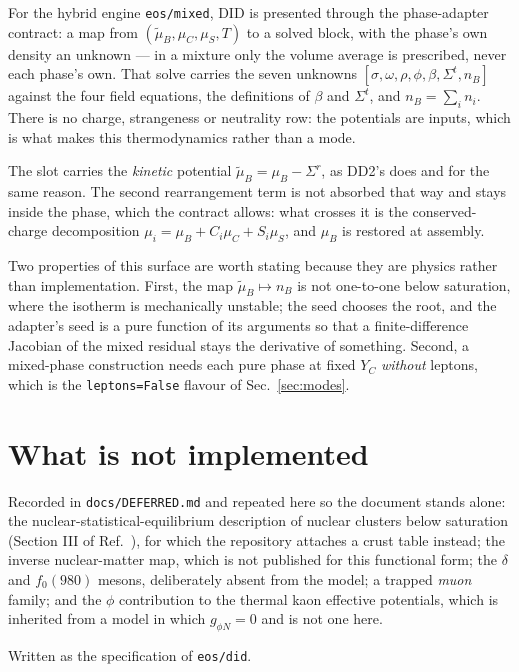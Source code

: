 \documentclass[aps,prc,onecolumn,superscriptaddress,nofootinbib,10pt]{revtex4-2}
\newcommand{\nB}{n_B}
\newcommand{\muB}{\mu_B}
\newcommand{\muC}{\mu_C}
\newcommand{\muS}{\mu_S}
\newcommand{\mutB}{\tilde{\mu}_B}
\newcommand{\Sigmar}{\Sigma^{r}}
\newcommand{\Sigmat}{\Sigma^{t}}
\begin{document}
For the hybrid engine \texttt{eos/mixed}, DID is presented through the
phase-adapter contract: a map from $(\mutB, \muC, \muS, T)$ to a solved block,
with the phase's own density an unknown --- in a mixture only the volume
average is prescribed, never each phase's own. That solve carries the seven
unknowns
$[\sigma, \omega, \rho, \phi, \beta, \Sigmat, \nB]$ against the four field
equations, the definitions of $\beta$ and $\Sigmat$, and
$\nB = \sum_i n_i$. There is no charge, strangeness or neutrality row: the
potentials are inputs, which is what makes this thermodynamics rather than a
mode.

The slot carries the \emph{kinetic} potential $\mutB = \muB - \Sigmar$, as
DD2's does and for the same reason. The second rearrangement term is not
absorbed that way and stays inside the phase, which the contract allows: what
crosses it is the conserved-charge decomposition
$\mu_i = \muB + C_i\muC + S_i\muS$, and $\muB$ is restored at assembly.

Two properties of this surface are worth stating because they are physics
rather than implementation. First, the map $\mutB \mapsto \nB$ is not
one-to-one below saturation, where the isotherm is mechanically unstable; the
seed chooses the root, and the adapter's seed is a pure function of its
arguments so that a finite-difference Jacobian of the mixed residual stays the
derivative of something. Second, a mixed-phase construction needs each pure
phase at fixed $Y_C$ \emph{without} leptons, which is the \texttt{leptons=False}
flavour of Sec.~\ref{sec:modes}.

\section{What is not implemented}
\label{sec:gaps}

Recorded in \texttt{docs/DEFERRED.md} and repeated here so the document stands
alone: the nuclear-statistical-equilibrium description of nuclear clusters
below saturation (Section III of Ref.~\cite{Frohaug2025}), for which the
repository attaches a crust table instead; the inverse nuclear-matter map,
which is not published for this functional form; the $\delta$ and $f_0(980)$
mesons, deliberately absent from the model; a trapped \emph{muon} family; and
the $\phi$ contribution to the thermal kaon effective potentials, which is
inherited from a model in which $g_{\phi N} = 0$ and is not one here.

\begin{acknowledgments}
Written as the specification of \texttt{eos/did}.
\end{acknowledgments}


\end{document}
